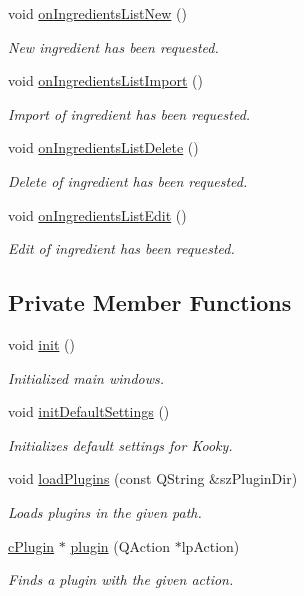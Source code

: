 \begin{DoxyCompactItemize}
void \hyperlink{classc_main_window_a6d1fb1143d310ce85ac4c1924ec9f1f5}{on\+Ingredients\+List\+New} ()
\begin{DoxyCompactList}\small\item\em New ingredient has been requested. \end{DoxyCompactList}\item 
void \hyperlink{classc_main_window_a1a0b99b15c690785791074ae0d13131d}{on\+Ingredients\+List\+Import} ()
\begin{DoxyCompactList}\small\item\em Import of ingredient has been requested. \end{DoxyCompactList}\item 
void \hyperlink{classc_main_window_a4bd73b0f35d28db5c4eb970fb188a3b4}{on\+Ingredients\+List\+Delete} ()
\begin{DoxyCompactList}\small\item\em Delete of ingredient has been requested. \end{DoxyCompactList}\item 
void \hyperlink{classc_main_window_a0dff97e5ba837d5b9ba04f7bde41dd1c}{on\+Ingredients\+List\+Edit} ()
\begin{DoxyCompactList}\small\item\em Edit of ingredient has been requested. \end{DoxyCompactList}\end{DoxyCompactItemize}
\subsection*{Private Member Functions}
\begin{DoxyCompactItemize}
\item 
void \hyperlink{classc_main_window_a3cc20776b1fd699783bcb1a0e2a33415}{init} ()
\begin{DoxyCompactList}\small\item\em Initialized main windows. \end{DoxyCompactList}\item 
void \hyperlink{classc_main_window_ac76cac25666ea2a0dc106b7829d560c7}{init\+Default\+Settings} ()
\begin{DoxyCompactList}\small\item\em Initializes default settings for Kooky. \end{DoxyCompactList}\item 
void \hyperlink{classc_main_window_a514f42d460641e3295b40867da99c50b}{load\+Plugins} (const Q\+String \&sz\+Plugin\+Dir)
\begin{DoxyCompactList}\small\item\em Loads plugins in the given path. \end{DoxyCompactList}\item 
\hyperlink{classc_plugin}{c\+Plugin} $\ast$ \hyperlink{classc_main_window_a24aea0791cf5bca5bd044bfbb72ef224}{plugin} (Q\+Action $\ast$lp\+Action)
\begin{DoxyCompactList}\small\item\em Finds a plugin with the given action. \end{DoxyCompactList}\end{DoxyCompactItemize}

